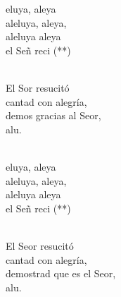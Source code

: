 \documentclass[12pt]{article}
\begin{document}
\begin{multicols*}{2}
\begin{cancion}%
	\begin{chorus}%
	eluya, aleya\\
	aleluya, aleya,\\
	aleluya aleya\\
	el Señ reci (**)  \\
	\end{chorus}%
	\jump\\
	El Sor resucitó \\
cantad con alegría,\\
	demos gracias al Seor,\\
	alu.\\\jump\\
	\begin{chorus}%
	eluya, aleya\\
	aleluya, aleya,\\
	aleluya aleya\\
	el Señ reci (**)  \\
	\end{chorus}%
	\jump\\
	El Seor resucitó\\
cantad con alegría,\\
	demostrad que es el Seor,\\
	alu.\\
\end{cancion}%


\end{multicols*}
\end{document}
